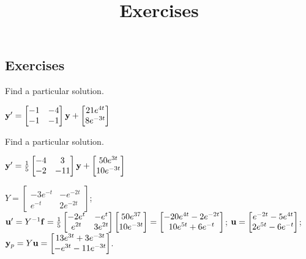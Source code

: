 \documentclass{ximera}
\title{Exercises} \license{CC BY-NC-SA 4.0}
\begin{document}
\begin{abstract}
\end{abstract}
\maketitle

\begin{onlineOnly}
\section*{Exercises}
\end{onlineOnly}


 \begin{problem}\label{exer:10.7.1}
 Find a particular solution.
 
 $ {\bf y}'=\begin{bmatrix}-1&-4\\-1&-1\end{bmatrix}{\bf
y}+\begin{bmatrix}21e^{4t}\\8e^{-3t}\end{bmatrix}$
\end{problem}

 \begin{problem}\label{exer:10.7.2}
 Find a particular solution.
 
 $ {\bf
y}'=\frac{1}{5}\begin{bmatrix}-4&3\\-2&-11\end{bmatrix}{\bf
y}+\begin{bmatrix}50e^{3t}\\10e^{-3t}\end{bmatrix}$

\begin{solution}
    $Y=\begin{bmatrix}
-3e^{-t}&-e^{-2t}\\e^{-t}&2e^{-2t}\end{bmatrix}$;
${\bf u}'=Y^{-1}{\bf f}=
\frac{1}{5}\begin{bmatrix}-2e^t&-e^t
\\e^{2t}&3e^{2t}\end{bmatrix}
\begin{bmatrix}
50e^{37}\\10e^{-3t}
\end{bmatrix}=
\begin{bmatrix}-20e^{4t}-2e^{-2t}\\
10e^{5t}+6e^{-t}\end{bmatrix}$;
${\bf u}=
\begin{bmatrix}e^{-2t}-5e^{4t}\\
2e^{5t}-6e^{-t}\end{bmatrix}$;
${\bf y}_p=Y{\bf u}=
\begin{bmatrix}13e^{3t}+3e^{-3t}\\
-e^{3t}-11e^{-3t}\end{bmatrix}$.

\end{solution}
\end{problem} 
\end{document}

